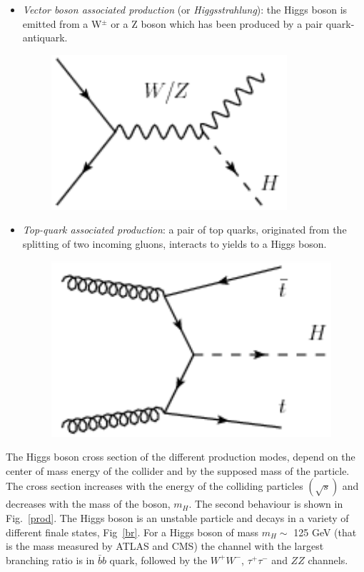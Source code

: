 \begin{itemize}
\begin{figure}[h]
\end{figure}
\item \textit{Vector boson associated production} (or \textit{Higgsstrahlung}):  the Higgs boson is emitted from a W$^{\pm}$ or a Z boson which has
been produced by a pair  quark-antiquark.
\begin{figure}[h]
\centering
\vspace{0.5cm}
\includegraphics[scale= 0.6]{../Cap1/hlung}
\end{figure}
\item \textit{Top-quark associated production}: a pair of top quarks, originated from
the splitting of two incoming gluons, interacts to yields to a Higgs boson. 
 \begin{figure}[!htbp]
\centering
\vspace{0.5cm}
\includegraphics[scale= 0.6]{../Cap1/tt}
\end{figure}  
\end{itemize}
The Higgs boson cross section of the different production modes, depend on the center of mass energy of the collider and by the supposed mass of the particle.
The cross section increases with the energy of the colliding particles $(\sqrt{s})$ and decreases with the mass of the boson, $m_H$. The second behaviour is shown in
Fig.~\ref{prod}. The Higgs boson is an unstable particle and decays in a variety of different finale states, Fig~\ref{br}. For a Higgs boson of mass $m_H \sim$ 125 GeV (that is the mass measured by ATLAS and CMS) the channel with the largest branching ratio is in $\bar{b}b$ quark, followed by the $W^+W^-$, $\tau^+ \tau^-$ and $ZZ$ channels.
